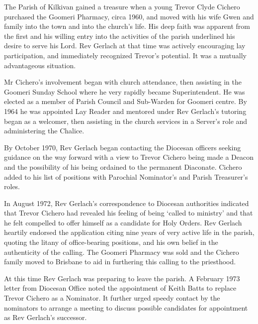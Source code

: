 The Parish of Kilkivan gained a treasure when a young Trevor Clyde Cichero purchased the Goomeri Pharmacy, circa 1960, and moved with his wife Gwen and family into the town and into the church's life. His deep faith was apparent from the first and his willing entry into the activities of the parish underlined his desire to serve his Lord. Rev Gerlach at that time was actively encouraging lay participation, and immediately recognized Trevor's potential. It was a mutually advantageous situation.



Mr Cichero's involvement began with church attendance, then assisting in the Goomeri Sunday School where he very rapidly became Superintendent. He was elected as a member of Parish Council and Sub-Warden for Goomeri centre. By 1964 he was appointed Lay Reader and mentored under Rev Gerlach's tutoring began as a welcomer, then assisting in the church services in a Server's role and administering the Chalice.



By October 1970, Rev Gerlach began contacting the Diocesan officers seeking guidance on the way forward with a view to Trevor Cichero being made a Deacon and the possibility of his being ordained to the permanent Diaconate. Cichero added to his list of positions with Parochial Nominator's and Parish Treasurer's roles.



In August 1972, Rev Gerlach's correspondence to Diocesan authorities indicated that Trevor Cichero had revealed his feeling of being `called to ministry' and that he felt compelled to offer himself as a candidate for Holy Orders. Rev Gerlach heartily endorsed the application citing nine years of very active life in the parish, quoting the litany of office-bearing positions, and his own belief in the authenticity of the calling. The Goomeri Pharmacy was sold and the Cichero family moved to Brisbane to aid in furthering this calling to the priesthood.



At this time Rev Gerlach was preparing to leave the parish. A February 1973 letter from Diocesan Office noted the appointment of Keith Batts to replace Trevor Cichero as a Nominator. It further urged speedy contact by the nominators to arrange a meeting to discuss possible candidates for appointment as Rev Gerlach's successor.




